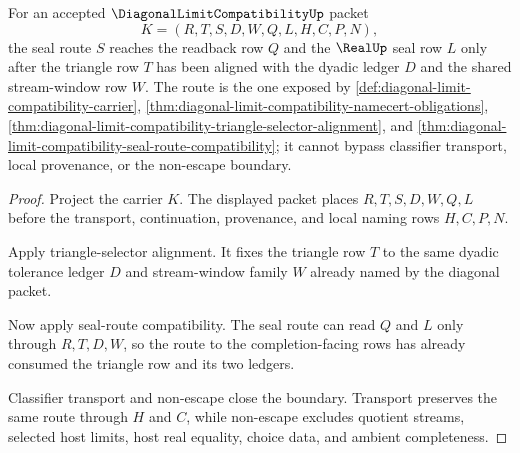 \begin{theorem}
\label{thm:diagonal-limit-compatibility-triangle-seal-route}
For an accepted $\DiagonalLimitCompatibilityUp$ packet
$$
K=(R,T,S,D,W,Q,L,H,C,P,N),
$$
the seal route $S$ reaches the readback row $Q$ and the $\RealUp$ seal row $L$ only after the triangle row $T$ has been aligned with the dyadic ledger $D$ and the shared stream-window row $W$. The route is the one exposed by \autoref{def:diagonal-limit-compatibility-carrier}, \autoref{thm:diagonal-limit-compatibility-namecert-obligations}, \autoref{thm:diagonal-limit-compatibility-triangle-selector-alignment}, and \autoref{thm:diagonal-limit-compatibility-seal-route-compatibility}; it cannot bypass classifier transport, local provenance, or the non-escape boundary.
\end{theorem}
\begin{proof}
Project the carrier $K$. The displayed packet places $R,T,S,D,W,Q,L$ before the transport, continuation, provenance, and local naming rows $H,C,P,N$.

Apply triangle-selector alignment. It fixes the triangle row $T$ to the same dyadic tolerance ledger $D$ and stream-window family $W$ already named by the diagonal packet.

Now apply seal-route compatibility. The seal route can read $Q$ and $L$ only through $R,T,D,W$, so the route to the completion-facing rows has already consumed the triangle row and its two ledgers.

Classifier transport and non-escape close the boundary. Transport preserves the same route through $H$ and $C$, while non-escape excludes quotient streams, selected host limits, host real equality, choice data, and ambient completeness.
\end{proof}

